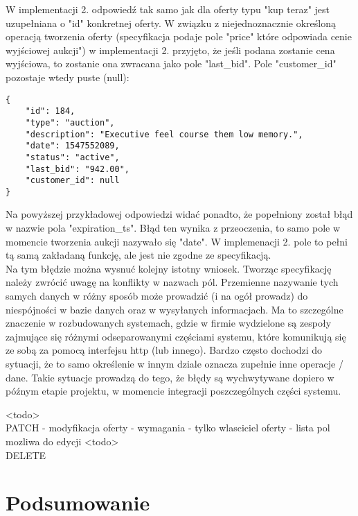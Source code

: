\documentclass[12pt, notitlepage]{article}
\begin{document}
W implementacji 2. odpowiedź tak samo jak dla oferty typu "kup teraz" jest uzupełniana o "id" konkretnej oferty. W związku z niejednoznacznie określoną operacją tworzenia oferty (specyfikacja podaje pole "price" które odpowiada cenie wyjściowej aukcji") w implementacji 2. przyjęto, że jeśli podana zostanie cena wyjściowa, to zostanie ona zwracana jako pole "last\_bid". Pole "customer\_id" pozostaje wtedy puste (null):
\begin{lstlisting}
{
    "id": 184,
    "type": "auction",
    "description": "Executive feel course them low memory.",
    "date": 1547552089,
    "status": "active",
    "last_bid": "942.00",
    "customer_id": null
}
\end{lstlisting}
Na powyższej przykładowej odpowiedzi widać ponadto, że popełniony został błąd w nazwie pola "expiration\_ts". Błąd ten wynika z przeoczenia, to samo pole w momencie tworzenia aukcji nazywało się "date". W implemenacji 2. pole to pełni tą samą zakładaną funkcję, ale jest nie zgodne ze specyfikacją. \\
Na tym błędzie można wysnuć kolejny istotny wniosek. Tworząc specyfikację należy zwrócić uwagę na konflikty w nazwach pól. Przemienne nazywanie tych samych danych w różny sposób może prowadzić (i na ogół prowadz) do niespójności w bazie danych oraz w wysyłanych informacjach. Ma to szczególne znaczenie w rozbudowanych systemach, gdzie w firmie wydzielone są zespoły zajmujące się różnymi odseparowanymi częściami systemu, które komunikują się ze sobą za pomocą interfejsu http (lub innego). Bardzo często dochodzi do sytuacji, że to samo określenie w innym dziale oznacza zupełnie inne operacje / dane. Takie sytuacje prowadzą do tego, że błędy są wychwytywane dopiero w późnym etapie projektu, w momencie integracji poszczególnych części systemu.


<todo> \\
PATCH - modyfikacja oferty
- wymagania - tylko wlasciciel oferty
- lista pol mozliwa do edycji
<todo> \\
DELETE


\section{Podsumowanie}
\end{document}
